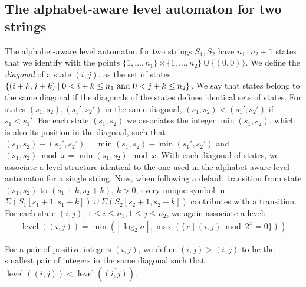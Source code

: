 \documentclass[a4paper,11pt]{article}
\DeclareMathOperator{\level}{level}
\begin{document}
\subsection{The alphabet-aware level automaton for two strings}
The alphabet-aware level automaton for two strings $S_1,S_2$ have $ n_1 \cdot  n_2 +1$ states that we identify with the points $\{1,\ldots,  n_1 \}\times\{1,\ldots,  n_2 \}\cup \{(0,0)\}$. We define the \emph{diagonal} of a state $(i,j)$, as the set of states $\{(i+k, j+k) \;|\; 0 < i+k \leq  n_1 \textnormal{ and } 0 < j+k \leq  n_2 \}$. We say that states belong to the same diagonal if the diagonals of the states defines identical sets of states. For states $(s_1, s_2),(s_1',s_2')$ in the same diagonal, $(s_1, s_2)<(s_1',s_2')$ if $s_1 < s_1'$. For each state $(s_1, s_2)$ we associates the integer $\min(s_1,s_2)$, which is also its position in the diagonal, such that $(s_1, s_2)- (s_1', s_2')=\min(s_1,s_2)-\min(s_1',s_2')$ and $(s_1,s_2) \bmod x = \min(s_1,s_2) \bmod x$. With each diagonal of states, we associate a level structure identical to the one used in the alphabet-aware level automaton for a single string.  Now, when following a default transition from state $(s_1, s_2)$ to $(s_1+k, s_2+k)$, $k>0$, every unique symbol in $\Sigma(S_1[s_1+1, s_1+k])\cup \Sigma(S_2[s_2+1, s_2+k])$ contributes with a transition.
For each state $(i,j)$, $1\leq i \leq n_1,1\leq j \leq n_2$, we again associate a level:
\begin{gather*}
\level((i,j)) = \min(\left\lceil \log_2 \sigma \right\rceil, \max(\{x \;|\; (i,j) \bmod 2^x = 0 \}))
\end{gather*}



For a pair of positive integers $(i,j)$, we define $\overline{(i,j)}>(i,j)$ to be the smallest pair of integers in the same diagonal such that $\level((i,j)) < \level(\overline{(i,j)})$.
\end{document}
